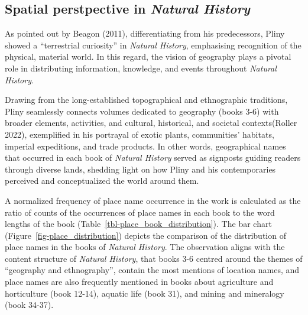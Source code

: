 \documentclass[
  12pt,
]{article}
\begin{document}
\hypertarget{spatial-perstpective-in-natural-history}{%
\subsection{\texorpdfstring{Spatial perstpective in \emph{Natural
History}}{Spatial perstpective in Natural History}}\label{spatial-perstpective-in-natural-history}}

As pointed out by Beagon (2011), differentiating from his predecessors,
Pliny showed a ``terrestrial curiosity'' in \emph{Natural History},
emphasising recognition of the physical, material world. In this regard,
the vision of geography plays a pivotal role in distributing
information, knowledge, and events throughout \emph{Natural History}.

Drawing from the long-established topographical and ethnographic
traditions, Pliny seamlessly connects volumes dedicated to geography
(books 3-6) with broader elements, activities, and cultural, historical,
and societal contexts(Roller 2022), exemplified in his portrayal of
exotic plants, communities' habitats, imperial expeditions, and trade
products. In other words, geographical names that occurred in each book
of \emph{Natural History} served as signposts guiding readers through
diverse lands, shedding light on how Pliny and his contemporaries
perceived and conceptualized the world around them.

A normalized frequency of place name occurrence in the work is
calculated as the ratio of counts of the occurrences of place names in
each book to the word lengths of the book
(Table~\ref{tbl-place_book_distribution}). The bar chart
(Figure~\ref{fig-place_distribution}) depicts the comparison of the
distribution of place names in the books of \emph{Natural History}. The
observation aligns with the content structure of \emph{Natural History},
that books 3-6 centred around the themes of ``geography and
ethnography'', contain the most mentions of location names, and place
names are also frequently mentioned in books about agriculture and
horticulture (book 12-14), aquatic life (book 31), and mining and
mineralogy (book 34-37).
\end{document}
